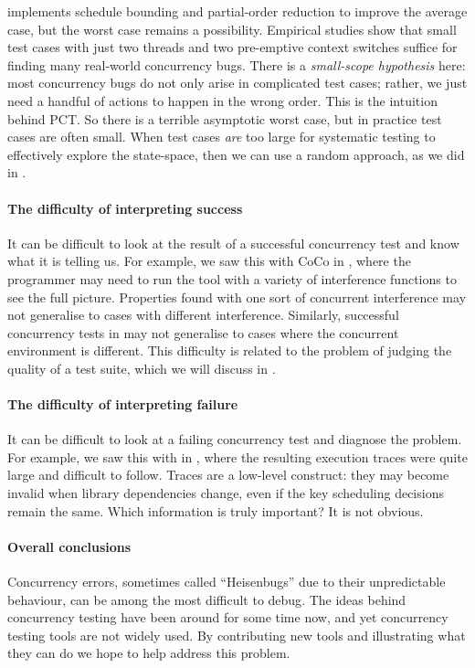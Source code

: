 \dejafu{} implements schedule
bounding\cite{emmi2011,musuvathi2008,musuvathi2007} and partial-order
reduction\cite{flanagan2005,godefroid1996} to improve the average
case, but the worst case remains a possibility.  Empirical studies
show that small test cases with just two threads and two pre-emptive
context switches suffice for finding many real-world concurrency
bugs\cite{thomson2014}.  There is a \emph{small-scope hypothesis}
here: most concurrency bugs do not only arise in complicated test
cases; rather, we just need a handful of actions to happen in the
wrong order.  This is the intuition behind PCT\cite{burckhardt2010}.
So there is a terrible asymptotic worst case, but in practice test
cases are often small.  When test cases \emph{are} too large for
systematic testing to effectively explore the state-space, then we can
use a random approach, as we did in .

\paragraph{The difficulty of interpreting success}
It can be difficult to look at the result of a successful concurrency
test and know what it is telling us.  For example, we saw this with
CoCo in , where the programmer may need to run
the tool with a variety of interference functions to see the full
picture.  Properties found with one sort of concurrent interference
may not generalise to cases with different interference.  Similarly,
successful concurrency tests in \dejafu{} may not generalise to cases
where the concurrent environment is different.  This difficulty is
related to the problem of judging the quality of a test suite, which
we will discuss in .

\paragraph{The difficulty of interpreting failure}
It can be difficult to look at a failing concurrency test and diagnose
the problem.  For example, we saw this with \dejafu{} in
, where the resulting execution
traces were quite large and difficult to follow.  Traces are a
low-level construct: they may become invalid when library dependencies
change, even if the key scheduling decisions remain the same.  Which
information is truly important?  It is not obvious.

\paragraph{Overall conclusions}
Concurrency errors, sometimes called ``Heisenbugs'' due to their
unpredictable behaviour, can be among the most difficult to
debug\cite{musuvathi2008osdi}.  The ideas behind concurrency testing
have been around for some time now\cite{godefroid1996}, and yet
concurrency testing tools are not widely used.  By contributing new
tools and illustrating what they can do we hope to help address this
problem.
